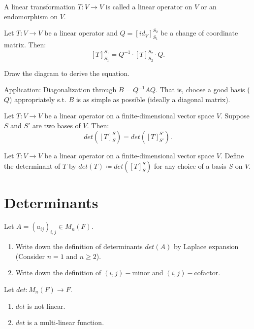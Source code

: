 \documentclass[12pt]{article}
\begin{document}
\begin{definition}
    A linear transformation $T:V\rightarrow V$ is called a linear operator on $V$ or an endomorphism on $V$. 
\end{definition}

\begin{theorem}
    Let $T:V\rightarrow V$ be a linear operator and $Q=[id_V]^{S_2}_{S_1}$ be a change of coordinate matrix. Then:
    \[[T]^{S_1}_{S_1}=Q^{-1}\cdot[T]^{S_2}_{S_2}\cdot Q.\]
\end{theorem}

\begin{pf}
    Draw the diagram to derive the equation.
\end{pf}

Application: Diagonalization through $B=Q^{-1}AQ$. That is, choose a good basis ($Q$) appropriately s.t. $B$ is as simple as possible (ideally a diagonal matrix).

\begin{theorem}
   Let $T:V\rightarrow V$ be a linear operator on a finite-dimensional vector space $V$.
   Suppose $S$ and $S'$ are two bases of $V$. Then:
   \[det([T]^{S}_{S})=det([T]^{S'}_{S'}).\]
\end{theorem}

\begin{definition}
     Let $T:V\rightarrow V$ be a linear operator on a finite-dimensional vector space $V$.
     Define the determinant of $T$ by $det(T)\coloneq det([T]^{S}_{S})$ for any choice of a basis $S$ on $V$.
\end{definition}


\newpage
\section{Determinants}

\begin{exercise}
    Let $A=(a_{ij})_{i,j}\in M_n(F).$
    \begin{enumerate}
        \item Write down the definition of determinants $det(A)$ by Laplace expansion (Consider $n=1$ and $n\geq 2$).
        \item Write down the definition of $(i,j)-$minor and $(i,j)-$cofactor.
    \end{enumerate}
\end{exercise}

\begin{remark}
 Let $det: M_n(F)\rightarrow F$. 
 \begin{enumerate}
    \item $det$ is not linear.
    \item $det$ is a multi-linear function.
 \end{enumerate}
\end{remark}
\end{document}
